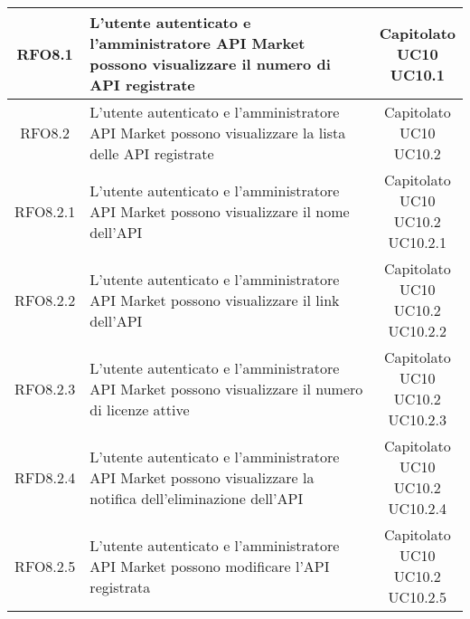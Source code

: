 \begin{longtable}{|c|p{8cm}|c|}
\hypertarget{RFO8.1}{RFO8.1} &  L'utente autenticato e l'amministratore API Market possono visualizzare il numero di API registrate & \makecell*{Capitolato\\UC10\\UC10.1} \\
\hline

\hypertarget{RFO8.2}{RFO8.2} &  L'utente autenticato e l'amministratore API Market possono visualizzare la lista delle API registrate & \makecell*{Capitolato\\UC10\\UC10.2} \\
\hline

\hypertarget{RFO8.2.1}{RFO8.2.1} &  L'utente autenticato e l'amministratore API Market possono visualizzare il nome dell'API & \makecell*{Capitolato\\UC10\\UC10.2\\UC10.2.1} \\
\hline

\hypertarget{RFO8.2.2}{RFO8.2.2} &  L'utente autenticato e l'amministratore API Market possono visualizzare il link dell'API & \makecell*{Capitolato\\UC10\\UC10.2\\UC10.2.2} \\
\hline

\hypertarget{RFO8.2.3}{RFO8.2.3} &  L'utente autenticato e l'amministratore API Market possono visualizzare il numero di licenze attive & \makecell*{Capitolato\\UC10\\UC10.2\\UC10.2.3} \\
\hline

\hypertarget{RFD8.2.4}{RFD8.2.4} &  L'utente autenticato e l'amministratore API Market possono visualizzare la notifica dell'eliminazione dell'API & \makecell*{Capitolato\\UC10\\UC10.2\\UC10.2.4} \\
\hline

\hypertarget{RFO8.2.5}{RFO8.2.5} &  L'utente autenticato e l'amministratore API Market possono modificare l'API registrata & \makecell*{Capitolato\\UC10\\UC10.2\\UC10.2.5} \\
\hline


\end{longtable}
